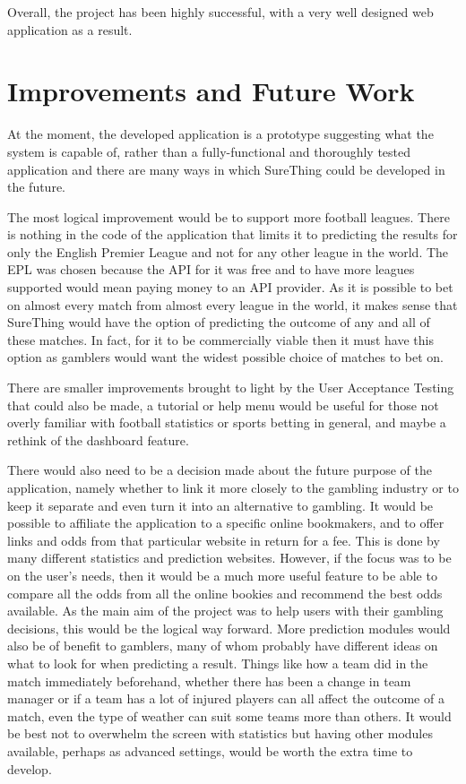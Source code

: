Overall, the project has been highly successful, with a very well designed web application as a result.

\section{Improvements and Future Work}
\label{sec:enchancement_conclusion}

At the moment, the developed application is a prototype suggesting what the system is capable of, rather than a fully-functional and thoroughly tested application and there are many ways in which SureThing could be developed in the future.

The most logical improvement would be to support more football leagues. There is nothing in the code of the application that limits it to predicting the results for only the English Premier League and not for any other league in the world. The EPL was chosen because the API for it was free and to have more leagues supported would mean paying money to an API provider. As it is possible to bet on almost every match from almost every league in the world, it makes sense that SureThing would have the option of predicting the outcome of any and all of these matches. In fact, for it to be commercially viable then it must have this option as gamblers would want the widest possible choice of matches to bet on.

There are smaller improvements brought to light by the User Acceptance Testing that could also be made, a tutorial or help menu would be useful for those not overly familiar with football statistics or sports betting in general, and maybe a rethink of the dashboard feature. 

There would also need to be a decision made about the future purpose of the application, namely whether to link it more closely to the gambling industry or to keep it separate and even turn it into an alternative to gambling.  It would be possible to affiliate the application to a specific online bookmakers, and to offer links and odds from that particular website in return for a fee. This is done by many different statistics and prediction websites. However, if the focus was to be on the user's needs, then it would be a much more useful feature to be able to compare all the odds from all the online bookies and recommend the best odds available. As the main aim of the project was to help users with their gambling decisions, this would be the logical way forward. More prediction modules would also be of benefit to gamblers, many of whom probably have different ideas on what to look for when predicting a result. Things like how a team did in the match immediately beforehand, whether there has been a change in team manager or if a team has a lot of injured players can all affect the outcome of a match, even the type of weather can suit some teams more than others. It would be best not to overwhelm the screen with statistics but having other modules available, perhaps as advanced settings, would be worth the extra time to develop. 

